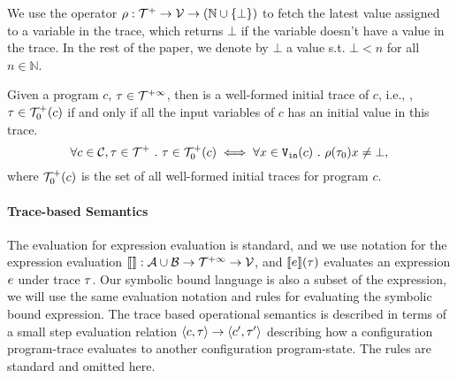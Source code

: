 We use the operator $\rho : {\mathcal{T}^{+}}  \to \mathcal{V} \to(\mathbb{N} \cup \{\bot\})$ to fetch the latest value assigned to a variable in the trace, which returns $\bot$ if the variable doesn't have a value in the trace.
In the rest of the paper, we denote by $\bot$ a value s.t. $\bot < n $ for all $n \in \mathbb{N}$.
%
%
%
\begin{defn}
  \label{def:initial_trace}
  Given a program $c$, $\mathtt{\tau} \in \mathcal{T}^{+\infty}$, then is a well-formed initial trace of $c$, i.e., , $\mathtt{\tau} \in \mathcal{T}^{+}_0(c)$ if and only if all the input variables of $c$ has an initial value in this trace.
  \[
    \forall c \in \mathcal{C}, \mathtt{\tau} \in \mathcal{T}^{+} ~.~ \mathtt{\tau} \in \mathcal{T}^{+}_0(c) \iff 
    \forall x \in {\ensuremath{\mathtt{V_{\mathtt{in}}}}}(c) ~.~ \rho(\mathtt{\tau}_0) x \neq \bot,
    \]
where $\mathcal{T}^{+}_0(c)$ is the set of all well-formed initial traces for program $c$.
\end{defn}
%
%
\paragraph{Trace-based Semantics}
The evaluation for expression evaluation is standard, and 
we use notation for the expression evaluation $\llbracket  \rrbracket : \mathcal{A} \cup \mathcal{B} \to \mathcal{T}^{+\infty} \to \mathcal{V}$, and $\llbracket e \rrbracket(\mathtt{\tau})$ evaluates an expression $e$ under trace $\mathtt{\tau}$.
Our symbolic bound language is also a subset of the expression, we will use the same evaluation notation and rules for evaluating the symbolic bound expression.
The trace based operational semantics is described in terms of a small step evaluation relation $\langle c, \mathtt{\tau} \rangle \to \langle c', \mathtt{\tau}' \rangle$ describing how a configuration program-trace evaluates to another configuration
program-state.
The rules are standard and omitted here.

